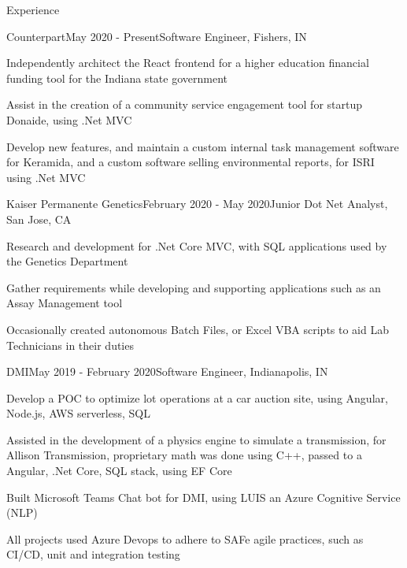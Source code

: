 \documentclass{resume} %
\begin{document}
\begin{rSection}{Experience}
\begin{rSubsection}{Counterpart}{May 2020 - Present}{Software Engineer, Fishers, IN}

    \item Independently architect the React frontend for a higher education financial funding tool for the Indiana state government
    \item Assist in the creation of a community service engagement tool for startup Donaide, using .Net MVC
    \item Develop new features, and maintain a custom internal task management software for Keramida, and a custom software selling environmental reports, for ISRI using .Net MVC
    \end{rSubsection}
\begin{rSubsection}{Kaiser Permanente Genetics}{February 2020 - May 2020}{Junior Dot Net Analyst, San Jose, CA}
\item Research and development for .Net Core MVC, with SQL applications used by the Genetics Department
\item Gather requirements while developing and supporting applications such as an Assay Management tool
\item Occasionally created autonomous Batch Files, or Excel VBA scripts to aid Lab Technicians in their duties
\end{rSubsection}
\begin{rSubsection}{DMI}{May 2019 - February 2020}{Software Engineer, Indianapolis, IN}

\item Develop a POC to optimize lot operations at a car auction site, using Angular, Node.js, AWS serverless, SQL
\item Assisted in the development of a physics engine to simulate a transmission, for Allison Transmission, proprietary math was done using C++, passed to a Angular, .Net Core, SQL stack, using EF Core
\item Built Microsoft Teams Chat bot for DMI, using LUIS an Azure Cognitive Service (NLP)
\item All projects used Azure Devops to adhere to SAFe agile practices, such as CI/CD, unit and integration testing
\end{rSubsection}
\end{rSection}

\end{document}
